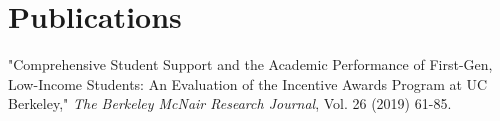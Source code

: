 \section{\sc Publications}

"Comprehensive Student Support and the Academic Performance of First-Gen, Low-Income Students: An Evaluation of the Incentive Awards Program at UC Berkeley," \textit{The Berkeley McNair Research Journal}, Vol. 26 (2019) 61-85.

\endinput